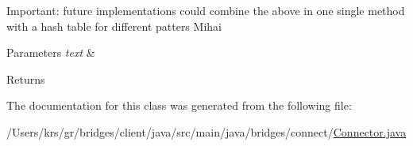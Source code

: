 Important\+: future implementations could combine the above in one single method with a hash table for different patters Mihai 
\begin{DoxyParams}{Parameters}
{\em text} & \\
\hline
\end{DoxyParams}
\begin{DoxyReturn}{Returns}

\end{DoxyReturn}


The documentation for this class was generated from the following file\+:\begin{DoxyCompactItemize}
\item 
/\+Users/krs/gr/bridges/client/java/src/main/java/bridges/connect/\hyperlink{_connector_8java}{Connector.\+java}\end{DoxyCompactItemize}
